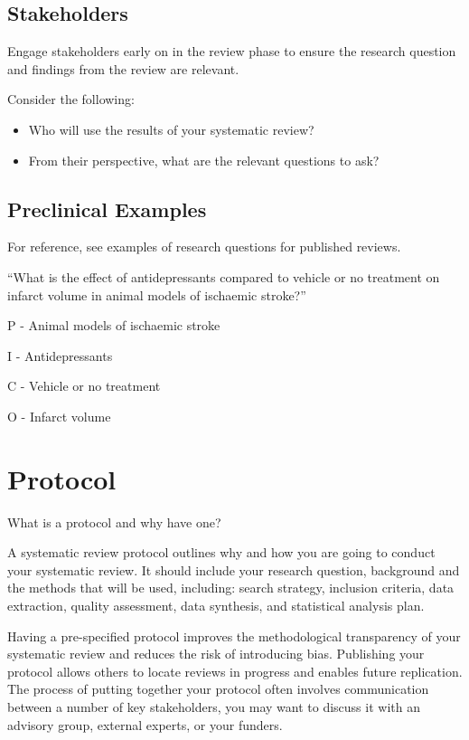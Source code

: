 \documentclass[
]{book}
\begin{document}
\hypertarget{stakeholders}{%
\section{Stakeholders}\label{stakeholders}}

Engage stakeholders early on in the review phase to ensure the research question and findings from the review are relevant.

Consider the following:

\begin{itemize}
\item
  Who will use the results of your systematic review?
\item
  From their perspective, what are the relevant questions to ask?
\end{itemize}

\hypertarget{preclinical-examples}{%
\section{Preclinical Examples}\label{preclinical-examples}}

For reference, see examples of research questions for published reviews.

``What is the effect of antidepressants compared to vehicle or no treatment on infarct volume in animal models of ischaemic stroke?''

P - Animal models of ischaemic stroke

I - Antidepressants

C - Vehicle or no treatment

O - Infarct volume

\hypertarget{protocol}{%
\chapter{Protocol}\label{protocol}}

What is a protocol and why have one?

A systematic review protocol outlines why and how you are going to conduct your systematic review. It should include your research question, background and the methods that will be used, including: search strategy, inclusion criteria, data extraction, quality assessment, data synthesis, and statistical analysis plan.

Having a pre-specified protocol improves the methodological transparency of your systematic review and reduces the risk of introducing bias. Publishing your protocol allows others to locate reviews in progress and enables future replication. The process of putting together your protocol often involves communication between a number of key stakeholders, you may want to discuss it with an advisory group, external experts, or your funders.
\end{document}
